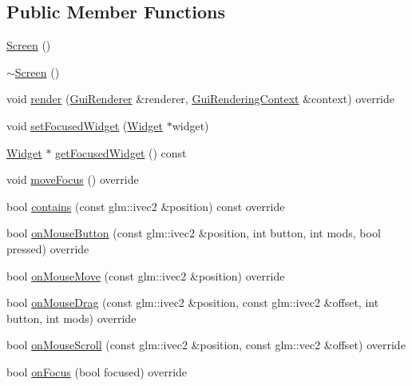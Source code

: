 \subsection*{Public Member Functions}
\begin{DoxyCompactItemize}
\item 
\mbox{\hyperlink{classec__gui_1_1_screen_a70d376c7107983dc3e57f70c2eef3ffa}{Screen}} ()
\item 
\mbox{\hyperlink{classec__gui_1_1_screen_ae31ba095c31a7811bb18b0049511565c}{$\sim$\+Screen}} ()
\item 
void \mbox{\hyperlink{classec__gui_1_1_screen_adf5a08d769e059f46261de227506cf9a}{render}} (\mbox{\hyperlink{classec__gui_1_1_gui_renderer}{Gui\+Renderer}} \&renderer, \mbox{\hyperlink{classec__gui_1_1_gui_rendering_context}{Gui\+Rendering\+Context}} \&context) override
\item 
void \mbox{\hyperlink{classec__gui_1_1_screen_a39b7f411e77c6db516e590605a0db872}{set\+Focused\+Widget}} (\mbox{\hyperlink{classec__gui_1_1_widget}{Widget}} $\ast$widget)
\item 
\mbox{\hyperlink{classec__gui_1_1_widget}{Widget}} $\ast$ \mbox{\hyperlink{classec__gui_1_1_screen_ad61162c9b00737f13cdd4ea868a91839}{get\+Focused\+Widget}} () const
\item 
void \mbox{\hyperlink{classec__gui_1_1_screen_a7f641a6e7331d1f9f2f07997961a4568}{move\+Focus}} () override
\item 
bool \mbox{\hyperlink{classec__gui_1_1_screen_a0948bb5fb9286b2c95045282f21f21cc}{contains}} (const glm\+::ivec2 \&position) const override
\item 
bool \mbox{\hyperlink{classec__gui_1_1_screen_a52e91a7c1d03514256956b72860f52ff}{on\+Mouse\+Button}} (const glm\+::ivec2 \&position, int button, int mods, bool pressed) override
\item 
bool \mbox{\hyperlink{classec__gui_1_1_screen_a9dc8a7c1650bb6ffb271d13bdea3688a}{on\+Mouse\+Move}} (const glm\+::ivec2 \&position) override
\item 
bool \mbox{\hyperlink{classec__gui_1_1_screen_aac1958cf78cf6194ffcf347fa49ad65a}{on\+Mouse\+Drag}} (const glm\+::ivec2 \&position, const glm\+::ivec2 \&offset, int button, int mods) override
\item 
bool \mbox{\hyperlink{classec__gui_1_1_screen_ad0ffcfff7027005dd6cd8d5dcc168a0c}{on\+Mouse\+Scroll}} (const glm\+::ivec2 \&position, const glm\+::vec2 \&offset) override
\item 
bool \mbox{\hyperlink{classec__gui_1_1_screen_a24a7266d24d743aa7b4c4fce6e8d2235}{on\+Focus}} (bool focused) override

\end{DoxyCompactItemize}
